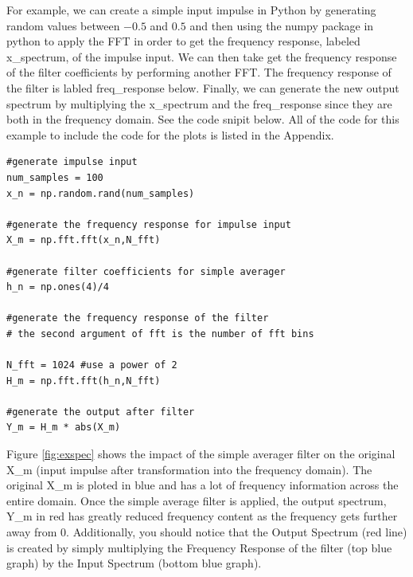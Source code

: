 For example, we can create a simple input impulse in Python by generating random values between $-0.5$ and $0.5$ and then using the numpy package in python to apply the FFT in order to get the frequency response, labeled x\_spectrum, of the impulse input.  We can then take get the frequency response of the filter coefficients by performing another FFT.  The frequency response of the filter is labled freq\_response below.  Finally, we can generate the new output spectrum by multiplying the x\_spectrum and the freq\_response since they are both in the frequency domain.  See the code snipit below.  All of the code for this example to include the code for the plots is listed in the Appendix.  

\lstset{language=Python}
\lstset{frame=lines}
\lstset{basicstyle=\footnotesize}
\begin{lstlisting}
#generate impulse input
num_samples = 100
x_n = np.random.rand(num_samples)

#generate the frequency response for impulse input
X_m = np.fft.fft(x_n,N_fft)

#generate filter coefficients for simple averager
h_n = np.ones(4)/4

#generate the frequency response of the filter
# the second argument of fft is the number of fft bins

N_fft = 1024 #use a power of 2
H_m = np.fft.fft(h_n,N_fft)

#generate the output after filter
Y_m = H_m * abs(X_m)
\end{lstlisting}

Figure \ref{fig:exspec} shows the impact of the simple averager filter on the original X\_m (input impulse after transformation into the frequency domain).  The original X\_m is ploted in blue and has a lot of frequency information across the entire domain.  Once the simple average filter is applied, the output spectrum, Y\_m in red has greatly reduced frequency content as the frequency gets further away from 0.  Additionally, you should notice that the Output Spectrum (red line) is created by simply multiplying the Frequency Response of the filter (top blue graph) by the Input Spectrum (bottom blue graph).  

